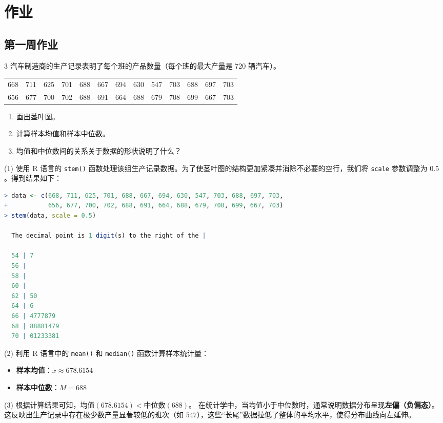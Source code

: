 \chapter{作业}
\section{第一周作业}
\begin{homework}{3}
    汽车制造商的生产记录表明了每个班的产品数量（每个班的最大产量是 720 辆汽车）。
    \begin{center}
        \begin{tabular}{ccccccccccccc}
            668 & 711 & 625 & 701 & 688 & 667 & 694 & 630 & 547 & 703 & 688 & 697 & 703 \\
            656 & 677 & 700 & 702 & 688 & 691 & 664 & 688 & 679 & 708 & 699 & 667 & 703 \\
        \end{tabular}
    \end{center}
    \begin{enumerate}
        \item 画出茎叶图。
        \item 计算样本均值和样本中位数。
        \item 均值和中位数间的关系关于数据的形状说明了什么？
    \end{enumerate}
\end{homework}
\begin{solution}



(1) 使用 R 语言的 \texttt{stem()} 函数处理该组生产记录数据。为了使茎叶图的结构更加紧凑并消除不必要的空行，我们将 \texttt{scale} 参数调整为 $0.5$。得到结果如下：

\begin{lstlisting}[language=R]
> data <- c(668, 711, 625, 701, 688, 667, 694, 630, 547, 703, 688, 697, 703,
+           656, 677, 700, 702, 688, 691, 664, 688, 679, 708, 699, 667, 703)
> stem(data, scale = 0.5)

  The decimal point is 1 digit(s) to the right of the |

  54 | 7
  56 | 
  58 | 
  60 | 
  62 | 50
  64 | 6
  66 | 4777879
  68 | 88881479
  70 | 01233381
\end{lstlisting}

(2) 利用 R 语言中的 \texttt{mean()} 和 \texttt{median()} 函数计算样本统计量：
\begin{itemize}
    \item \textbf{样本均值}：$\bar{x} \approx 678.6154$
    \item \textbf{样本中位数}：$M = 688$
\end{itemize}

(3) 根据计算结果可知，$\text{均值} (678.6154) < \text{中位数} (688)$。
在统计学中，当均值小于中位数时，通常说明数据分布呈现\textbf{左偏（负偏态）}。这反映出生产记录中存在极少数产量显著较低的班次（如 $547$），这些“长尾”数据拉低了整体的平均水平，使得分布曲线向左延伸。

\end{solution}

